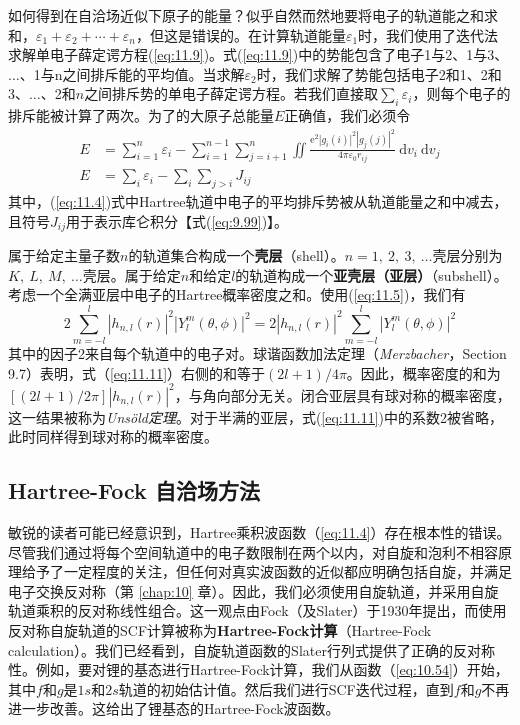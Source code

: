     如何得到在自洽场近似下原子的能量？似乎自然而然地要将电子的轨道能之和求和，$\varepsilon_1 + \varepsilon_2 + \cdots + \varepsilon_n$，但这是错误的。在计算轨道能量$\varepsilon_1$时，我们使用了迭代法求解单电子薛定谔方程(\ref{eq:11.9})。式(\ref{eq:11.9})中的势能包含了电子1与2、1与3、$\ldots$、1与n之间排斥能的平均值。当求解$\varepsilon_2$时，我们求解了势能包括电子2和1、2和3、$\ldots$、2和$n$之间排斥势的单电子薛定谔方程。若我们直接取$\sum_i \varepsilon_i$，则每个电子的排斥能被计算了两次。为了的大原子总能量$E$正确值，我们必须令
    \begin{align}
        E &= \sum_{i=1}^{n} \varepsilon_{i} - \sum_{i=1}^{n-1} \sum_{j=i+1}^{n} \iint \frac{\mathrm{e}^{2} |g_{i}(i)|^{2} |g_{j}(j)|^{2}}{4 \pi \varepsilon_{0} r_{i j}} \:\mathrm{d}v_{i} \:\mathrm{d}v_{j} \label{eq:11.10} \\
        E &= \sum_{i} \varepsilon_{i} - \sum_{i} \sum_{j>i} J_{ij} \nonumber
    \end{align}
    其中，(\ref{eq:11.4})式中Hartree轨道中电子的平均排斥势被从轨道能量之和中减去，且符号$J_{ij}$用于表示库仑积分【式(\ref{eq:9.99})】。

    属于给定主量子数$n$的轨道集合构成一个\textbf{壳层}（shell）。$n = 1, \: 2, \: 3, \: \ldots$壳层分别为$K, \: L, \: M, \: \ldots$壳层。属于给定$n$和给定$l$的轨道构成一个\textbf{亚壳层（亚层）}（subshell）。考虑一个全满亚层中电子的Hartree概率密度之和。使用(\ref{eq:11.5})，我们有
    \begin{equation}
        2 \sum_{m=-l}^{l} \left|h_{n,l}(r)\right|^2 \left|Y_l^m(\theta, \phi)\right|^2 = 2\left|h_{n,l}(r)\right|^2 \sum_{m=-l}^{l} \left|Y_l^m(\theta, \phi)\right|^2
        \label{eq:11.11}
    \end{equation}
    其中的因子2来自每个轨道中的电子对。球谐函数加法定理（\textit{Merzbacher}，Section 9.7）表明，式（\ref{eq:11.11}）右侧的和等于$\left(2l + 1\right) / 4\pi$。因此，概率密度的和为$\left[\left(2l + 1\right) / 2\pi\right]\left|h_{n,l}(r)\right|^2$，与角向部分无关。闭合亚层具有球对称的概率密度，这一结果被称为\textit{Unsöld定理}。对于半满的亚层，式(\ref{eq:11.11})中的系数2被省略，此时同样得到球对称的概率密度。

\subsection*{Hartree-Fock 自洽场方法}

    敏锐的读者可能已经意识到，Hartree乘积波函数（\ref{eq:11.4}）存在根本性的错误。尽管我们通过将每个空间轨道中的电子数限制在两个以内，对自旋和泡利不相容原理给予了一定程度的关注，但任何对真实波函数的近似都应明确包括自旋，并满足电子交换反对称（第 \ref{chap:10} 章）。因此，我们必须使用自旋轨道，并采用自旋轨道乘积的反对称线性组合。这一观点由Fock（及Slater）于1930年提出，而使用反对称自旋轨道的SCF计算被称为\textbf{Hartree-Fock计算}（Hartree-Fock calculation）。我们已经看到，自旋轨道函数的Slater行列式提供了正确的反对称性。例如，要对锂的基态进行Hartree-Fock计算，我们从函数（\ref{eq:10.54}）开始，其中$f$和$g$是$1s$和$2s$轨道的初始估计值。然后我们进行SCF迭代过程，直到$f$和$g$不再进一步改善。这给出了锂基态的Hartree-Fock波函数。

